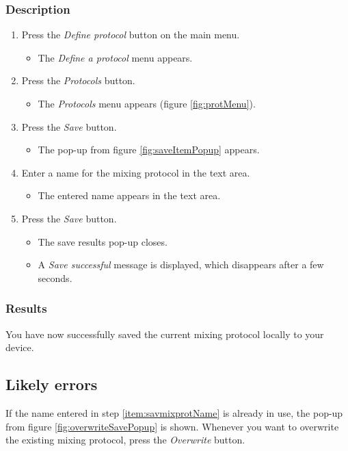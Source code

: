\subsubsection{Description}
\begin{enumerate}
	\item Press the \emph{Define protocol} button on the main menu.
		\begin{itemize}
            \item The \emph{Define a protocol} menu appears.
		\end{itemize}
	\item Press the \emph{Protocols} button.
		\begin{itemize}
			\item The \emph{Protocols} menu appears (figure \ref{fig:protMenu}).
		\end{itemize}
	\item Press the \emph{Save} button.
		\begin{itemize}
			\item The pop-up from figure \ref{fig:saveItemPopup} appears.
		\end{itemize}
	\item Enter a name for the mixing protocol in the text area. \label{item:savmixprotName}
		\begin{itemize}
			\item The entered name appears in the text area.
		\end{itemize}
	\item Press the \emph{Save} button.
		\begin{itemize}
			\item The save results pop-up closes.
			\item A \emph{Save successful} message is displayed, which disappears after a few seconds.
		\end{itemize}
\end{enumerate}

\subsubsection{Results}
You have now successfully saved the current mixing protocol locally to your device.

\subsection{Likely errors}
If the name entered in step \ref{item:savmixprotName} is already in use, the pop-up from figure \ref{fig:overwriteSavePopup} is shown. Whenever you want to overwrite the existing mixing protocol, press the \emph{Overwrite} button.

